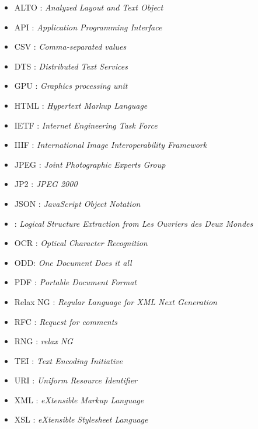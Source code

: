 \begin{itemize}
    \item ALTO : \textit{Analyzed Layout and Text Object}
    \item API : \textit{Application Programming Interface}
    \item CSV : \textit{Comma-separated values}
    \item DTS : \textit{Distributed Text Services}
    \item GPU : \textit{Graphics processing unit}
    \item HTML : \textit{Hypertext Markup Language}
    \item IETF : \textit{Internet Engineering Task Force}
    \item IIIF : \textit{International Image Interoperability Framework}
    \item JPEG : \textit{Joint Photographic Experts Group}
    \item JP2 : \textit{JPEG 2000}
    \item JSON : \textit{JavaScript Object Notation}
    \item \lse{} : \textit{Logical Structure Extraction from Les Ouvriers des Deux Mondes}
    \item OCR : \textit{Optical Character Recognition}
    \item ODD: \textit{One Document Does it all}
    \item PDF : \textit{Portable Document Format}
    \item Relax NG : \textit{Regular Language for XML Next Generation}
    \item RFC : \textit{Request for comments}
    \item RNG : \cf{} \textit{relax NG}
    \item TEI : \textit{Text Encoding Initiative}
    \item URI : \textit{Uniform Resource Identifier}
    \item XML : \textit{eXtensible Markup Language}
    \item XSL : \textit{eXtensible Stylesheet Language}
\end{itemize}

\clearpage
\thispagestyle{empty}